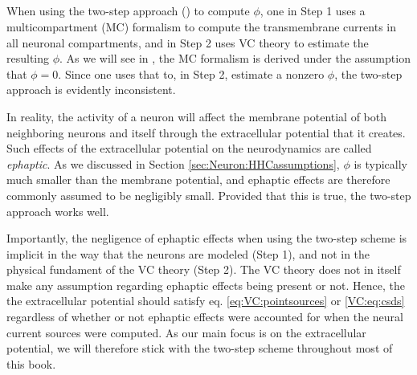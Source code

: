 \subsection{ }
\label{sec:Bascis:ephaptic} 
When using the two-step approach () to compute $\phi$, one in Step 1 uses a multicompartment (MC) formalism to compute the transmembrane currents in all neuronal compartments, and in Step 2 uses VC theory to estimate the resulting $\phi$. As we will see in , the MC formalism is derived under the assumption that $\phi=0$. Since one uses that to, in Step 2, estimate a nonzero $\phi$, the two-step approach is evidently inconsistent.


In reality, the activity of a neuron will affect the membrane potential of both neighboring neurons and itself through the extracellular potential that it creates. Such effects of the extracellular potential on the neurodynamics are called \textit{ephaptic}. As we discussed in Section \ref{sec:Neuron:HHCassumptions}, $\phi$ is typically much smaller than the membrane potential, and ephaptic effects are therefore commonly assumed to be negligibly small. Provided that this is true, the two-step approach works well. 

Importantly, the negligence of ephaptic effects when using the two-step scheme is implicit in the way that the neurons are modeled (Step 1), and not in the physical fundament of the VC theory (Step 2). The VC theory does not in itself make any assumption regarding ephaptic effects being present or not. Hence, the the extracellular potential should satisfy eq. \ref{eq:VC:pointsources} or \ref{VC:eq:csds} regardless of whether or not ephaptic effects were accounted for when the neural current sources were computed. As our main focus is on the extracellular potential, we will therefore stick with the two-step scheme throughout most of this book.
